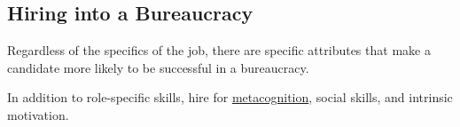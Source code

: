 \subsection{Hiring into a Bureaucracy}
Regardless of the specifics of the job, there are specific attributes that make a candidate more likely to be successful in a bureaucracy. 

In addition to role-specific skills, hire for \href{https://en.wikipedia.org/wiki/Metacognition}{metacognition}, social skills, and intrinsic motivation.




